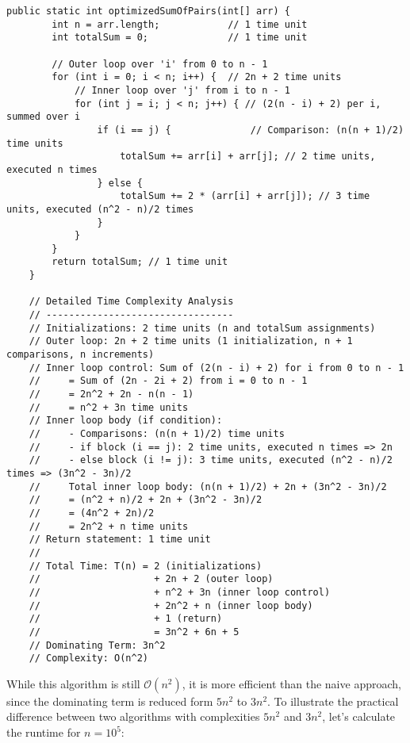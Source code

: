 \begin{lstlisting}[style = javaStyle, caption={Optimized Sum of Pairs with Analysis}, label={lst:java_optimized_sum_pairs_analysis}]
    public static int optimizedSumOfPairs(int[] arr) {
        int n = arr.length;            // 1 time unit
        int totalSum = 0;              // 1 time unit
    
        // Outer loop over 'i' from 0 to n - 1
        for (int i = 0; i < n; i++) {  // 2n + 2 time units
            // Inner loop over 'j' from i to n - 1
            for (int j = i; j < n; j++) { // (2(n - i) + 2) per i, summed over i
                if (i == j) {              // Comparison: (n(n + 1)/2) time units
                    totalSum += arr[i] + arr[j]; // 2 time units, executed n times
                } else {
                    totalSum += 2 * (arr[i] + arr[j]); // 3 time units, executed (n^2 - n)/2 times
                }
            }
        }
        return totalSum; // 1 time unit
    }
    
    // Detailed Time Complexity Analysis
    // ---------------------------------
    // Initializations: 2 time units (n and totalSum assignments)
    // Outer loop: 2n + 2 time units (1 initialization, n + 1 comparisons, n increments)
    // Inner loop control: Sum of (2(n - i) + 2) for i from 0 to n - 1
    //     = Sum of (2n - 2i + 2) from i = 0 to n - 1
    //     = 2n^2 + 2n - n(n - 1)
    //     = n^2 + 3n time units
    // Inner loop body (if condition): 
    //     - Comparisons: (n(n + 1)/2) time units
    //     - if block (i == j): 2 time units, executed n times => 2n
    //     - else block (i != j): 3 time units, executed (n^2 - n)/2 times => (3n^2 - 3n)/2
    //     Total inner loop body: (n(n + 1)/2) + 2n + (3n^2 - 3n)/2
    //     = (n^2 + n)/2 + 2n + (3n^2 - 3n)/2
    //     = (4n^2 + 2n)/2
    //     = 2n^2 + n time units
    // Return statement: 1 time unit
    //
    // Total Time: T(n) = 2 (initializations)
    //                    + 2n + 2 (outer loop)
    //                    + n^2 + 3n (inner loop control)
    //                    + 2n^2 + n (inner loop body)
    //                    + 1 (return)
    //                    = 3n^2 + 6n + 5
    // Dominating Term: 3n^2
    // Complexity: O(n^2)
\end{lstlisting}

While this algorithm is still $\mathcal{O}(n^2)$, it is more efficient than the naive approach, since the dominating term is reduced form $5n^2$ to $3n^2$. To illustrate the practical difference between two algorithms with complexities \(5n^2\) and \(3n^2\), let's calculate the runtime for \(n = 10^5\):

